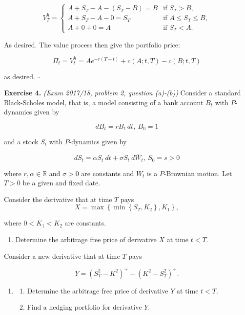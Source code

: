 \documentclass[a4paper,12pt,openany]{book}
\providecommand{\tightlist}{%
 \setlength{\itemsep}{0pt}\setlength{\parskip}{0pt}}
\begin{document}
\[
V_T^h=
\begin{cases}
  A+S_T-A-(S_T-B)=B & \text{if }S_T>B,\\
  A + S_T - A-0=S_T& \text{if }A\le S_T\le B,\\
  A+0+0=A &\text{if }S_T< A.
\end{cases}
\]

As desired. The value process then give the portfolio price:

\[
\Pi_t=V_t^h=Ae^{-r(T-t)}+c(A;t,T)-c(B;t,T)
\]

as desired. \(\square\)

\textbf{Exercise 4.} \emph{(Exam 2017/18, problem 2, question (a)-(b))} Consider a standard Black-Scholes model, that is, a model consisting of a bank account \(B_t\) with \(P\)-dynamics given by

\[
dB_t=rB_t\ dt,\ B_0=1
\]

and a stock \(S_t\) with \(P\)-dynamics given by

\[
dS_t=\alpha S_t\ dt+\sigma S_t\ d\overline{W}_t,\ S_0=s>0
\]

where \(r,\alpha\in\mathbb{R}\) and \(\sigma >0\) are constants and \(\overline{W}_t\) is a \(P\)-Brownian motion. Let \(T>0\) be a given and fixed date.

Consider the derivative that at time \(T\) pays
\[
X=\max\left\{\min\left\{S_T,K_2\right\},K_1\right\},
\]

where \(0<K_1<K_2\) are constants.

\begin{enumerate}
\def\labelenumi{\alph{enumi}.}
\tightlist
\item
  Determine the arbitrage free price of derivative \(X\) at time \(t<T\).
\end{enumerate}

Consider a new derivative that at time \(T\) pays

\[
Y=(S^2_T-K^2)^+-(K^2-S^2_T)^+.
\]

\begin{enumerate}
\def\labelenumi{\alph{enumi}.}
\setcounter{enumi}{1}
\item
  \begin{enumerate}
  \def\labelenumii{\roman{enumii}.}
  \tightlist
  \item
    Determine the arbitrage free price of derivative \(Y\) at time \(t<T\).
  \item
    Find a hedging portfolio for derivative \(Y\).
  \end{enumerate}
\end{enumerate}
\end{document}
